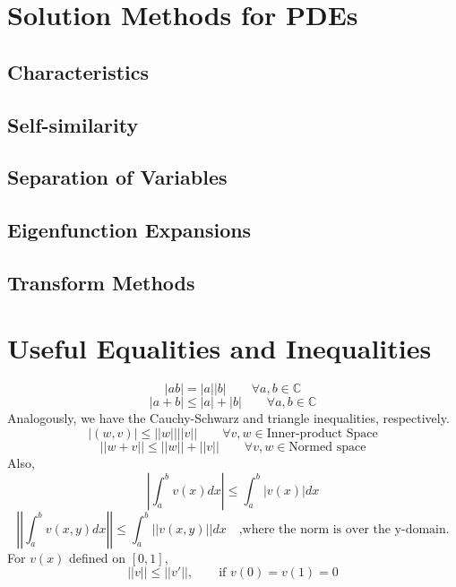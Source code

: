 \documentclass[oneside,a4paper,11pt]{report}
\begin{document}
\section{Solution Methods for PDEs}
\subsection{Characteristics}
\subsection{Self-similarity}
\subsection{Separation of Variables}
\subsection{Eigenfunction Expansions}
\subsection{Transform Methods}

\appendix
\section{Useful Equalities and Inequalities}
$$ |ab| = |a||b| \qquad \forall a,b \in \mathbb{C}$$
$$ |a+b| \le |a| + |b| \qquad \forall a,b \in \mathbb{C}$$
Analogously, we have the Cauchy-Schwarz and triangle inequalities, respectively.
$$|(w,v)| \le ||w|| ||v|| \qquad \forall v,w \in \text{Inner-product Space}$$
$$||w+v|| \le ||w|| + ||v|| \qquad \forall v,w \in \text{Normed space}$$
Also,
$$\left | \int_a^b v(x)dx \right | \le \int_a^b |v(x)| dx$$
$$\left |\left | \int_a^b v(x,y) dx \right |\right| \le \int_a^b ||v(x,y)||dx \quad \text{,where the norm is over the y-domain.}$$
For $v(x)$ defined on $[0,1]$, $$||v|| \le ||v'||, \qquad \text{if } v(0) = v(1) = 0$$

\end{document}
